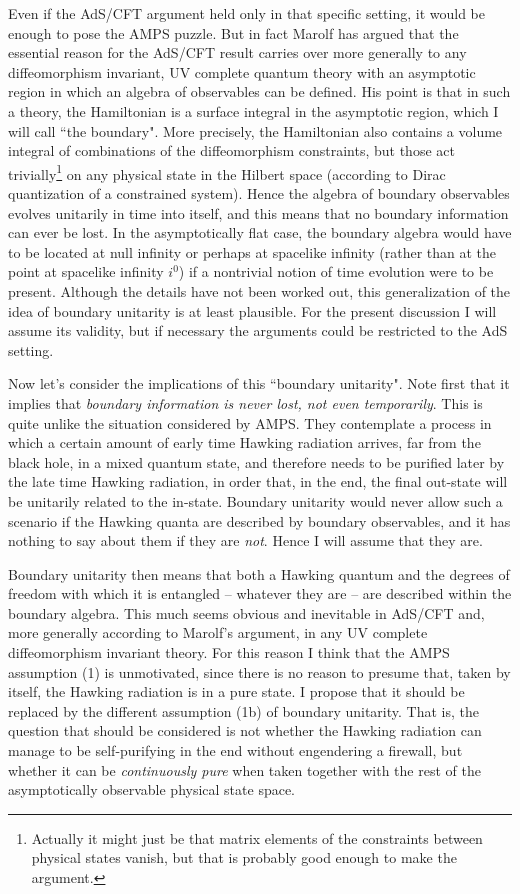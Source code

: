 \documentclass[12pt]{article}
\begin{document}
{Even if the AdS/CFT argument held only in that specific setting, 
it would be enough to pose the AMPS puzzle.
But in fact Marolf \cite{Marolf:2008mf} has argued that the essential reason for the AdS/CFT result
carries over more generally to any diffeomorphism invariant, UV complete quantum theory
with an asymptotic region in which an algebra of observables can be defined. 
His point is that in such a theory, the Hamiltonian is a surface integral in the 
asymptotic region, which I will call ``the boundary". More precisely, the Hamiltonian also
contains a volume integral of combinations of the diffeomorphism constraints,
but those act trivially\footnote{Actually it might just be that matrix elements of the constraints
between physical states vanish, but that is probably good enough to make the argument.} 
on any physical state in the Hilbert space (according to Dirac
quantization of a constrained system). Hence the algebra of boundary observables
evolves unitarily in time into itself, and this means that no boundary information can ever be lost.
In the asymptotically flat case, the boundary algebra would have 
to be located at null infinity or perhaps at spacelike infinity \cite{spi} (rather than at the point at
spacelike infinity $i^0$) if a nontrivial notion 
of time evolution were to be present. Although the details have not been worked out,
this generalization of the idea of boundary unitarity is at least plausible.
For the present discussion I will assume its validity, but if necessary the
arguments could be restricted to the AdS setting.

Now let's consider the implications of this ``boundary unitarity".  
Note first that it implies that {\it boundary information is never lost, not even temporarily}. 
This is quite unlike the situation considered by AMPS. They contemplate a process
in which a certain amount of early time Hawking radiation arrives, far from the black hole, in a 
mixed quantum state, and therefore needs to be purified later by the late time Hawking radiation,
in order that, in the end, the final out-state will be unitarily related to the in-state.
Boundary unitarity would never allow such a scenario if the Hawking quanta are described by
boundary observables, and it has nothing to say about them if they are \emph{not}. 
Hence I will assume that they are.

Boundary unitarity then means that both a Hawking quantum 
and the degrees of freedom with which it is 
entangled -- whatever they are -- are described
within the boundary algebra. This much seems obvious and inevitable in AdS/CFT and, more generally
according to Marolf's argument, in any UV complete diffeomorphism invariant theory. 
For this reason I think that the AMPS assumption (1) is unmotivated, since there is 
no reason to presume that, taken by itself, the Hawking radiation is in a pure state.  
I propose that it should be replaced by 
the different assumption (1b) of boundary unitarity. That is, the question that should be 
considered is not whether the Hawking radiation can manage to be self-purifying in the end without 
engendering a firewall, but whether it can be \emph{continuously pure} when taken together with 
the rest of the asymptotically observable physical state space.

}
\end{document}
